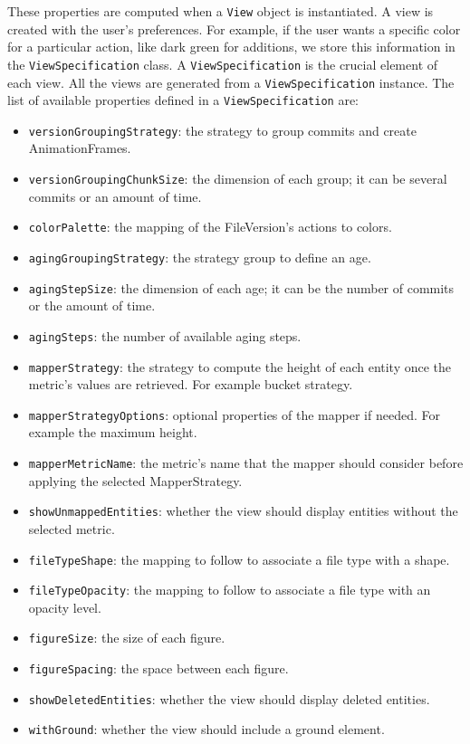 These properties are computed when a \texttt{View} object is instantiated. A view is created with the user's preferences. 
For example, if the user wants a specific color for a particular action, like dark green for additions, we store this information in the \texttt{ViewSpecification} class. A \texttt{ViewSpecification} is the crucial element of each view. 
All the views are generated from a \texttt{ViewSpecification} instance. The list of available properties defined in a \texttt{ViewSpecification} are:
\begin{itemize}
    \item \texttt{versionGroupingStrategy}: the strategy to group commits and create AnimationFrames.
    \item \texttt{versionGroupingChunkSize}: the dimension of each group; it can be several commits or an amount of time. 
    \item \texttt{colorPalette}: the mapping of the FileVersion's actions to colors. 
    \item \texttt{agingGroupingStrategy}: the strategy group to define an age.
    \item \texttt{agingStepSize}: the dimension of each age; it can be the number of commits or the amount of time. 
    \item \texttt{agingSteps}: the number of available aging steps. 
    \item \texttt{mapperStrategy}: the strategy to compute the height of each entity once the metric's values are retrieved. For example bucket strategy. 
    \item \texttt{mapperStrategyOptions}: optional properties of the mapper if needed. For example the maximum height. 
    \item \texttt{mapperMetricName}: the metric's name that the mapper should consider before applying the selected MapperStrategy. 
    \item \texttt{showUnmappedEntities}: whether the view should display entities without the selected metric.
    \item \texttt{fileTypeShape}: the mapping to follow to associate a file type with a shape.
    \item \texttt{fileTypeOpacity}: the mapping to follow to associate a file type with an opacity level.
    \item \texttt{figureSize}: the size of each figure.
    \item \texttt{figureSpacing}: the space between each figure.
    \item \texttt{showDeletedEntities}: whether the view should display deleted entities.
    \item \texttt{withGround}: whether the view should include a ground element.
\end{itemize}

